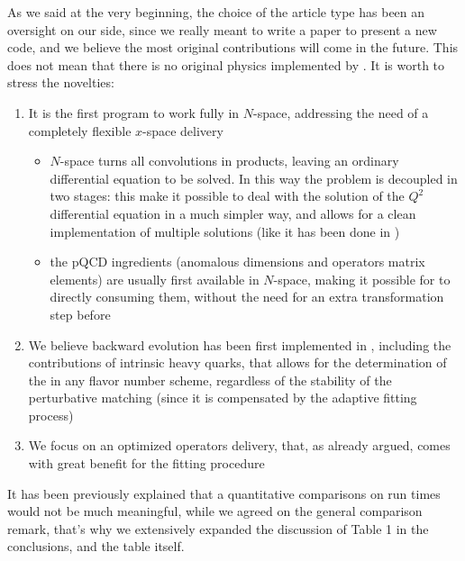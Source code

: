 \documentclass[a4paper,11pt]{article}
\begin{document}
\begin{response}
As we said at the very beginning, the choice of the article type has
been an oversight on our side, since we really meant to write a paper to
present a new code, and we believe the most original contributions will come in
the future. This does not mean that there is no original physics implemented by
\eko{}. It is worth to stress the \eko{} novelties:
\begin{enumerate}
  \item It is the first program to work fully in $N$-space,
    addressing the need of a completely flexible $x$-space delivery
  \begin{itemize}
    \item $N$-space turns all convolutions in products, leaving an ordinary
      differential equation to be solved. In this way the problem is decoupled
      in two stages: this make it possible to deal with the 
      solution of the $Q^2$ differential equation in a much simpler way,
      and allows for a clean implementation of multiple solutions (like it has
      been done in \pegasus{})
    \item the pQCD ingredients (anomalous dimensions and operators matrix
      elements) are usually first available in $N$-space, making it possible
      for \eko{} to directly consuming them, without the need for an extra
      transformation step before
  \end{itemize}
  \item We believe backward \vfns{} evolution has been first implemented in \eko{}, including the
    contributions of intrinsic heavy quarks, that allows for the determination
    of the \pdf{} in any flavor number scheme, regardless of the stability of
    the perturbative matching (since it is compensated by the adaptive fitting
    process)
  \item We focus on an optimized operators delivery, that, as already argued, comes with great
    benefit for the \pdf{} fitting procedure
\end{enumerate}

It has been previously explained that a quantitative comparisons on run times
would not be much meaningful, while we agreed on the general comparison remark,
that's why we extensively expanded the discussion of Table 1 in the
conclusions, and the table itself.

\end{response}






\listoffixmes
\end{document}
